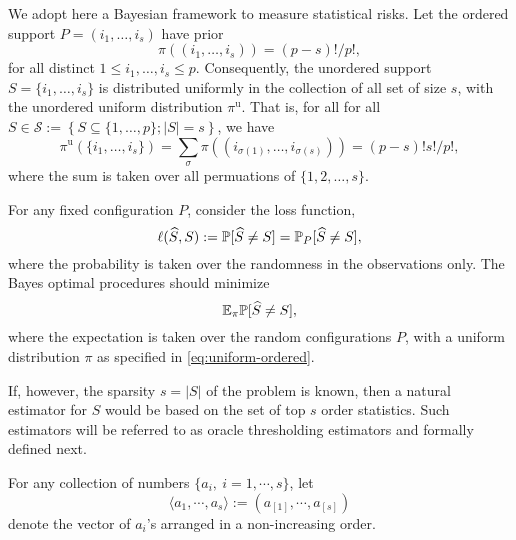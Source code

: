 We adopt here a Bayesian framework to measure statistical risks. 
Let the ordered support $P=(i_1,\ldots,i_s)$ have prior
\begin{equation} \label{eq:uniform-ordered}
\pi((i_1,\ldots, i_s)) = {(p-s)!}/{p!},
\end{equation}
for all distinct $1\le i_1, \ldots, i_s\le p$.
Consequently, the unordered support $S=\{i_1,\ldots,i_s\}$ is distributed uniformly in the collection of all set of size $s$, with the unordered uniform distribution $\pi^{\text{u}}$. That is, for all for all $S\in\mathcal{S}:=\left\{S\subseteq\{1,\ldots,p\};|S|=s\right\}$, we have 
\begin{equation} \label{eq:uniform}
\pi^{\text{u}}
(\{i_1,\ldots, i_s\}) = \sum_{\sigma}\pi((i_{\sigma(1)},\ldots, i_{\sigma(s)})) = {(p-s)!s!}/{p!},
\end{equation}
where the sum is taken over all permuations of $\{1,2,\ldots,s\}$.

For any fixed configuration $P$, consider the loss function,
$$
\ell(\widehat{S},S) := \P[\widehat{S} \neq S] = \P_{P}[\widehat{S} \neq S],
$$
where the probability is taken over the randomness in the observations only.
The Bayes optimal procedures should minimize 
\begin{equation} \label{eq:Bayes-risk}
    \E_\pi \P[\widehat{S} \neq S],
\end{equation}
where the expectation is taken over the random configurations $P$, with a uniform distribution $\pi$ as specified in \eqref{eq:uniform-ordered}.


If, however, the sparsity $s = |S|$ of the problem is known, then a natural estimator for $S$ would be based on the set of top $s$ order statistics. Such estimators will be referred to as oracle thresholding estimators and formally defined next. 

For any collection of numbers $\{a_i,\ i=1,\cdots,s\}$, let 
$$
\langle a_1,\cdots,a_s\rangle := (a_{[1]},\cdots,a_{[s]})
$$
denote the vector of $a_i$'s arranged in a non-increasing order.

